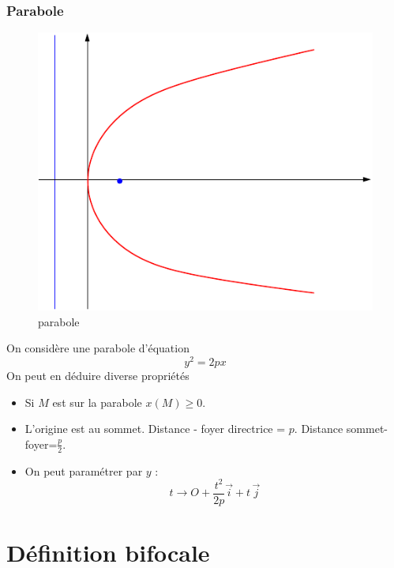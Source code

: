 \subsubsection{Parabole}
\begin{figure}[h!]
 \centering
 \includegraphics{./C4893_9.pdf}
 \caption{parabole}
 \label{fig:C4893_9}
\end{figure}
On considère une parabole d'équation 
\begin{displaymath}
 y^2 = 2p x
\end{displaymath}
On peut en déduire diverse propriétés
\begin{itemize}
 \item Si $M$ est sur la parabole $x(M)\geq 0$.
 \item L'origine est au sommet. Distance - foyer directrice = $p$. Distance sommet-foyer=$\frac{p}{2}$.
 \item On peut paramétrer par $y$ :
\begin{displaymath}
 t\rightarrow O + \frac{t^2}{2p}\overrightarrow i + t\,\overrightarrow j
\end{displaymath}

\end{itemize}



\section{Définition bifocale}
